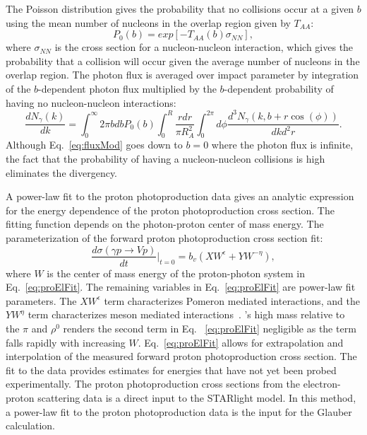     The Poisson distribution gives the probability that no collisions 
      occur at a given $b$ using the mean number of nucleons in the overlap 
      region given by $T_{AA}$:
    \begin{equation} \label{eg:poisNoCol}
      P_{0}(b)=exp[-T_{AA}(b)\sigma_{NN}],
    \end{equation}
    where $\sigma_{NN}$ is the cross section for a 
      nucleon-nucleon interaction, which gives the probability that a collision
      will occur given the average number of nucleons in the overlap region.
    The photon flux is averaged over impact parameter by integration of the 
      $b$-dependent photon flux multiplied by the $b$-dependent probability of having no 
      nucleon-nucleon interactions: 
    \begin{equation} \label{eq:fluxMod}
      \frac{dN_{\gamma}(k)}{dk}=\int_{0}^{\infty}{2\pi bdbP_{0}(b)
         \int_{0}^{R}{\frac{rdr}{\pi R^{2}_{A}}\int_{0}^{2\pi}d\phi
         \frac{d^{3}N_{\gamma}(k,b+r\cos(\phi))}{dkd^{2}r}}}.
    \end{equation}
    Although Eq.~\ref{eq:fluxMod} goes down to $b=0$ where the photon flux is 
      infinite, the fact that the probability of having a nucleon-nucleon collisions 
      is high eliminates the divergency.

    A power-law fit to the proton photoproduction data gives an analytic 
      expression for the energy dependence of the proton photoproduction 
      cross section.
    The fitting function depends on the photon-proton center of mass energy. 
    The parameterization of the forward proton photoproduction cross section 
      fit:
    \begin{equation} \label{eq:proElFit}
      \frac{d\sigma(\gamma p\rightarrow Vp)}{dt}\Big|_{t=0}
        =b_{v}(XW^{\epsilon}+YW^{-\eta}),
    \end{equation}
    where $W$ is the center of mass energy of the proton-photon system in 
      Eq.~\ref{eq:proElFit}.
    The remaining variables in Eq.~\ref{eq:proElFit} are power-law fit 
      parameters.  
    The $XW^{\epsilon}$ term characterizes Pomeron mediated interactions, and
      the $YW^{\eta}$ term characterizes meson mediated interactions~\cite{vmd1999}. 
    \JPsi{}'s high mass relative to the $\pi$ and $\rho^{0}$ renders the second 
      term in Eq. ~\ref{eq:proElFit} negligible as the term falls rapidly with
      increasing $W$. 
    Eq.~\ref{eq:proElFit} allows for extrapolation and interpolation of the 
      measured forward proton photoproduction cross section. 
    The fit to the data provides estimates for energies that have not yet been 
      probed experimentally.
    The proton photoproduction cross sections from the electron-proton 
      scattering data is a direct input to the STARlight model. 
    In this method, a power-law fit to the proton photoproduction data is the 
      input for the Glauber calculation. 

